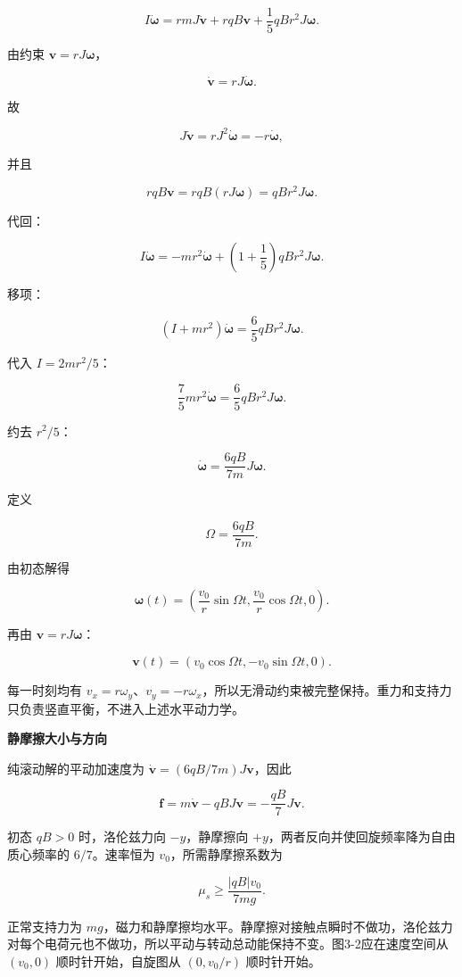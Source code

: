\documentclass[12pt,a4paper,UTF8]{ctexart}
\begin{document}
\[I\dot{\bm\omega}
=rmJ\dot{\bm v}+rqB\bm v+\frac15qBr^2J\bm\omega.\]

由约束 \(\bm v=rJ\bm\omega\)，

\[\dot{\bm v}=rJ\dot{\bm\omega}.\]

故

\[J\dot{\bm v}=rJ^2\dot{\bm\omega}=-r\dot{\bm\omega},\]

并且

\[rqB\bm v=rqB(rJ\bm\omega)=qBr^2J\bm\omega.\]

代回：

\[I\dot{\bm\omega}
=-mr^2\dot{\bm\omega}
+\left(1+\frac15\right)qBr^2J\bm\omega.\]

移项：

\[(I+mr^2)\dot{\bm\omega}=\frac65qBr^2J\bm\omega.\]

代入 \(I=2mr^2/5\)：

\[\frac75mr^2\dot{\bm\omega}=\frac65qBr^2J\bm\omega.\]

约去 \(r^2/5\)：

\[\dot{\bm\omega}=\frac{6qB}{7m}J\bm\omega.\]

定义

\[\Omega=\frac{6qB}{7m}.\]

由初态解得

\[\boxed{
\bm\omega(t)=
\left(
\frac{v_0}{r}\sin\Omega t,
\frac{v_0}{r}\cos\Omega t,
0
\right)
}.\]

再由 \(\bm v=rJ\bm\omega\)：

\[\boxed{
\bm v(t)=
\left(
v_0\cos\Omega t,
-v_0\sin\Omega t,
0
\right)
}.\]

每一时刻均有
\(v_x=r\omega_y\)、\(v_y=-r\omega_x\)，所以无滑动约束被完整保持。重力和支持力只负责竖直平衡，不进入上述水平动力学。

\textbf{静摩擦大小与方向}

纯滚动解的平动加速度为 \(\dot{\bm v}=(6qB/7m)J\bm v\)，因此

\[\bm f=m\dot{\bm v}-qBJ\bm v=-\frac{qB}{7}J\bm v.\]

初态 \(qB>0\) 时，洛伦兹力向 \(-y\)，静摩擦向
\(+y\)，两者反向并使回旋频率降为自由质心频率的 \(6/7\)。速率恒为
\(v_0\)，所需静摩擦系数为

\[\mu_s\ge\frac{|qB|v_0}{7mg}.\]

正常支持力为
\(mg\)，磁力和静摩擦均水平。静摩擦对接触点瞬时不做功，洛伦兹力对每个电荷元也不做功，所以平动与转动总动能保持不变。图3-2应在速度空间从
\((v_0,0)\) 顺时针开始，自旋图从 \((0,v_0/r)\) 顺时针开始。

\newpage
\end{document}
